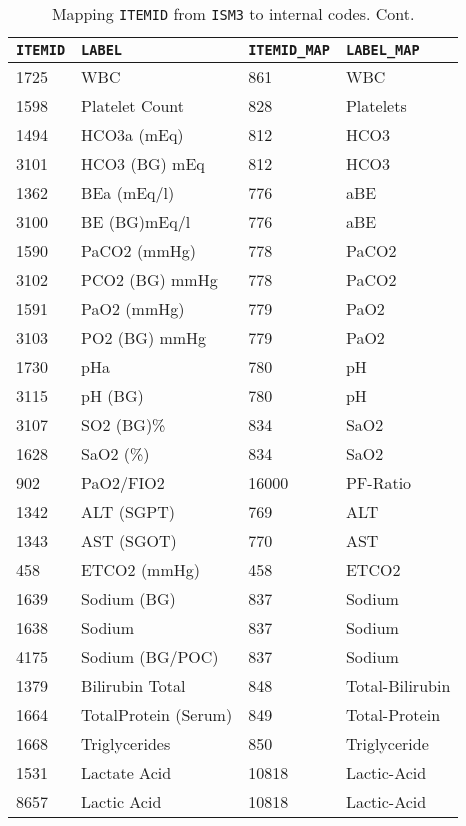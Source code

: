 \documentclass[
   technote
]{phildoc}
\begin{document}
\begin{table}[h!]
\center
\caption{Mapping \texttt{ITEMID} from \texttt{ISM3} to internal codes. Cont.}
\label{code_mapping_cont}
\begin{tabular}{l|l|l|l}
	\hline
	\verb|ITEMID| & \verb|LABEL| & \verb|ITEMID_MAP| & \verb|LABEL_MAP| \\
	\hline
	\hline
	1725 & WBC & 861 & WBC \\
	\hline
	1598 & Platelet Count & 828 & Platelets \\
	\hline
	1494 & HCO3a (mEq) & 812 & HCO3 \\
	\hline
	3101 & HCO3 (BG) mEq & 812 & HCO3 \\
	\hline
	1362 & BEa (mEq/l) & 776 & aBE \\
	\hline
	3100 & BE (BG)mEq/l & 776 & aBE \\
	\hline
	1590 & PaCO2 (mmHg) & 778 & PaCO2 \\
	\hline	
	3102 & PCO2 (BG) mmHg & 778 & PaCO2 \\
	\hline
	1591 & PaO2 (mmHg) & 779 & PaO2 \\
	\hline
	3103 & PO2 (BG) mmHg & 779 & PaO2 \\
	\hline
	1730 & pHa & 780 & pH \\
	\hline
	3115 & pH (BG) & 780 & pH \\
	\hline
	3107 & SO2 (BG)\% & 834 & SaO2 \\
	\hline
	1628 & SaO2 (\%) & 834 & SaO2 \\
	\hline	
	902 & PaO2/FIO2 & 16000 & PF-Ratio \\
	\hline
	1342 & ALT (SGPT) & 769 & ALT \\
	\hline
	1343 & AST (SGOT) & 770 & AST \\
	\hline
	458 & ETCO2 (mmHg) & 458 & ETCO2 \\
	\hline
	1639 & Sodium (BG) & 837 & Sodium \\
	\hline
	1638 & Sodium & 837 & Sodium \\
	\hline
	4175 & Sodium (BG/POC) & 837 & Sodium \\
	\hline
	1379 & Bilirubin Total & 848 & Total-Bilirubin \\
	\hline
	1664 & TotalProtein (Serum) & 849 & Total-Protein \\
	\hline
	1668 & Triglycerides & 850 & Triglyceride \\
	\hline
	1531 & Lactate Acid & 10818 & Lactic-Acid \\
	\hline
	8657 & Lactic Acid & 10818 & Lactic-Acid \\

\end{tabular}
\end{table}
\end{document}
